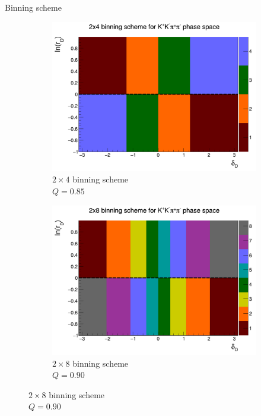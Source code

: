 \documentclass{beamer}
\begin{document}
\begin{frame}{Binning scheme}
  \begin{figure}
    \centering
    \vspace{-0.2cm}
    \begin{subfigure}{0.5\textwidth}
      \includegraphics[width = 1.0\textwidth]{Plots/BinningScheme4BinsPlot.png}
      \caption{$2\times 4$ binning scheme \\ $Q = 0.85$}
    \end{subfigure}%
    \begin{subfigure}{0.5\textwidth}
      \includegraphics[width = 1.0\textwidth]{Plots/BinningScheme8BinsPlot.png}
      \caption{$2\times 8$ binning scheme \\ $Q = 0.90$}
    \end{subfigure}
  \end{figure}
\end{frame}
\end{document}
